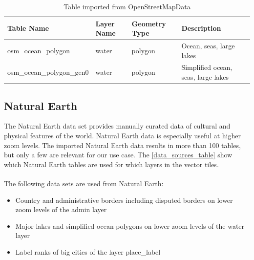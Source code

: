 \begin{table}[H]
\centering
    \begin{tabular}{llll}
    \hline
    Table Name            & Layer Name & Geometry Type & Description \\
    \hline
    osm\_ocean\_polygon        & water & polygon       & Ocean, seas, large lakes           \\
    osm\_ocean\_polygon_gen0        & water & polygon       & Simplified ocean, seas, large lakes           \\
    \end{tabular}
    \caption{Table imported from OpenStreetMapData}
\end{table}

\newpage
\subsection{Natural Earth}

The Natural Earth \cite{16_naturalearthdata.com_2015} data set provides manually curated data of cultural and physical features of the world. Natural Earth data is especially useful at higher zoom levels. The imported Natural Earth data results in more than 100 tables, but only a few
are relevant for our use case. The \autoref{data_sources_table} show which Natural Earth tables are used for which layers in the vector tiles.\\\\
The following data sets are used from Natural Earth:

\begin{itemize}
\item Country and administrative borders including disputed borders on lower zoom levels of the admin layer
\item Major lakes and simplified ocean polygons on lower zoom levels of the water layer
\item Label ranks of big cities of the layer place\_label
\end{itemize}

